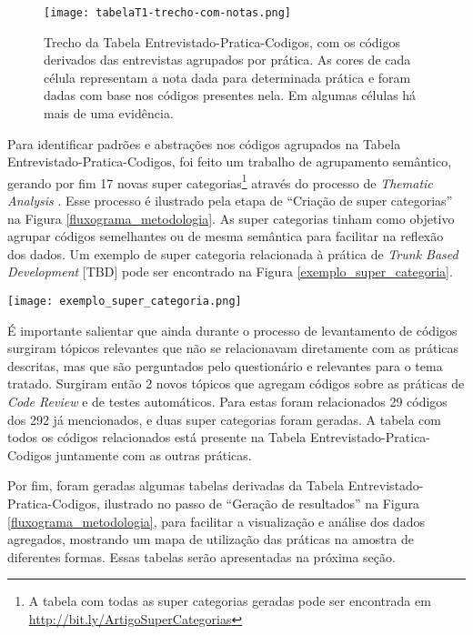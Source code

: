 \begin{figure}[ht]
    \begin{center}
    \texttt{[image: tabelaT1-trecho-com-notas.png]}
    \end{center}
    \caption[Trecho da Tabela Entrevistado-Pratica-Codigos]{
        Trecho da Tabela Entrevistado-Pratica-Codigos, com os códigos derivados das entrevistas agrupados por prática. As cores de cada célula representam a nota dada para determinada prática e foram dadas com base nos códigos presentes nela. Em algumas células há mais de uma evidência.
}\label{trecho_tabela_t1}
\end{figure}

Para identificar padrões e abstrações nos códigos agrupados na Tabela Entrevistado-Pratica-Codigos, foi feito um trabalho de agrupamento semântico, gerando por fim 17 novas super categorias\footnote{A tabela com todas as super categorias geradas pode ser encontrada em \url{http://bit.ly/ArtigoSuperCategorias}} através do processo de \emph{Thematic Analysis} \cite{groundedTheory}. Esse processo é ilustrado pela etapa de ``Criação de super categorias'' na Figura \ref{fluxograma_metodologia}. As super categorias tinham como objetivo agrupar códigos semelhantes ou de mesma semântica para facilitar na reflexão dos dados. Um exemplo de super categoria relacionada à prática de \emph{Trunk Based Development} [TBD] pode ser encontrado na Figura \ref{exemplo_super_categoria}.


\begin{figure*}[ht]
\begin{center}
\texttt{[image: exemplo\_super\_categoria.png]}
\end{center}
\caption[Exemplo de super categoria]{
    Exemplo de super categoria gerada durante o processo de \emph{Thematic Analysis}.
}\label{exemplo_super_categoria}
\end{figure*}

É importante salientar que ainda durante o processo de levantamento de códigos surgiram tópicos relevantes que não se relacionavam diretamente com as práticas descritas, mas que são perguntados pelo questionário e relevantes para o tema tratado. Surgiram então 2 novos tópicos que agregam códigos sobre as práticas de \emph{Code Review} e de testes automáticos. Para estas foram relacionados 29 códigos dos 292 já mencionados, e duas super categorias foram geradas. A tabela com todos os códigos relacionados está presente na Tabela Entrevistado-Pratica-Codigos juntamente com as outras práticas.

Por fim, foram geradas algumas tabelas derivadas da Tabela Entrevistado-Pratica-Codigos, ilustrado no passo de ``Geração de resultados'' na Figura \ref{fluxograma_metodologia}, para facilitar a visualização e análise dos dados agregados, mostrando um mapa de utilização das práticas na amostra de diferentes formas. Essas tabelas serão apresentadas na próxima seção.
